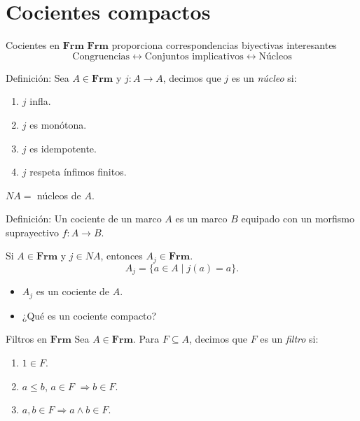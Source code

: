 \documentclass[compress,12pt]{beamer}
\begin{document}
\section{Cocientes compactos}
\begin{frame}{Cocientes en $\mathbf{Frm}$}
$\mathbf{Frm}$ proporciona correspondencias biyectivas interesantes
\[
\mbox{Congruencias}\leftrightarrow \mbox{Conjuntos implicativos}\leftrightarrow \mbox{Núcleos}
\]

\begin{block}{Definición:}
Sea $A\in \mathbf{Frm}$ y $j\colon A\to A$, decimos que $j$ es un \emph{núcleo} si:
\begin{enumerate}
    \item $j$ infla.
    \item $j$ es monótona.
    \item $j$ es idempotente.
    \item $j$ respeta ínfimos finitos.
\end{enumerate}
\end{block}

$NA=$ núcleos de $A$.
\end{frame}

\begin{frame}
\begin{block}{Definición:}
    Un cociente de un marco $A$ es un marco $B$ equipado con un morfismo suprayectivo $f\colon A\to B$.
\end{block}
Si $A\in \mathbf{Frm}$ y $j\in NA$, entonces $A_j\in \mathbf{Frm}$.
\[
A_j=\{a\in A\mid j(a)=a\}.
\]
\begin{itemize}
\item $A_j$ es un cociente de $A$.
\item ¿Qué es un cociente compacto?
\end{itemize}
\end{frame}

\begin{frame}{Filtros en $\mathbf{Frm}$}
    Sea $A\in \mathbf{Frm}$. Para $F\subseteq A$, decimos que $F$ es un \emph{filtro} si:
		\begin{enumerate}
			\item $1\in F$.
			\item $a\leq b$, $a\in  F$ $\Rightarrow b \in F$.
			\item $a, b \in F \Rightarrow  a \wedge b \in F$.
		\end{enumerate}
\end{frame}
\end{document}
